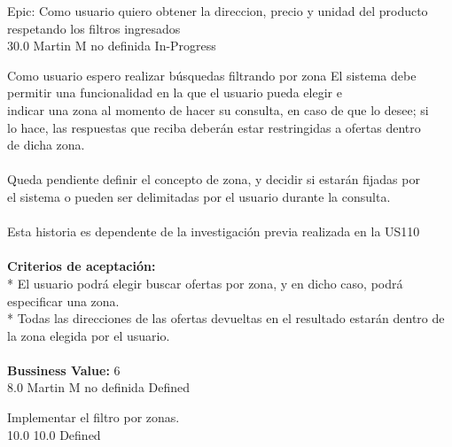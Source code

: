 \vspace{20pt}

	{Epic: Como usuario quiero obtener la direccion, precio y unidad del producto respetando los filtros ingresados} %
	{\\
} %
	{} %
	{30.0} %
	{Martin M} %
	{no definida} %
	{In-Progress} %


\vspace{20pt}

	{Como usuario espero realizar búsquedas filtrando por zona} %
	{El sistema debe permitir una funcionalidad en la que el usuario pueda elegir e\\
indicar una zona al momento de hacer su consulta, en caso de que lo desee; si\\
lo hace, las respuestas que reciba deberán estar restringidas a ofertas dentro\\
de dicha zona.\\
  \\
Queda pendiente definir el concepto de zona, y decidir si estarán fijadas por\\
el sistema o pueden ser delimitadas por el usuario durante la consulta.\\
  \\
Esta historia es dependente de la investigación previa realizada en la US110\\
  \\
\textbf{Criterios de aceptación:}\\
* El usuario podrá elegir buscar ofertas por zona, y en dicho caso, podrá especificar una zona.  \\
* Todas las direcciones de las ofertas devueltas en el resultado estarán dentro de la zona elegida por el usuario.\\
  \\
\textbf{Bussiness Value:} 6\\
} %
	{} %
	{8.0} %
	{Martin M} %
	{no definida} %
	{Defined} %

		{Implementar el filtro por zonas.} %
		{\\
} %
		{10.0} %
		{} %
		{10.0} %
		{Defined} %


